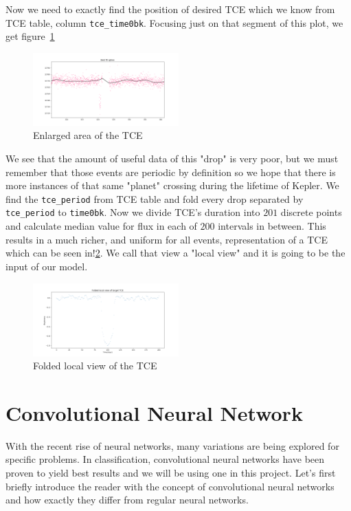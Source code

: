 \documentclass[twoside]{article}
\newcommand{\code}[1]{\texttt{#1}}
\begin{document}
\begin{multicols}{2}
Now we need to exactly find the position of desired TCE which we know from TCE table, column \code{tce\_time0bk}. Focusing just on that segment of this plot, we get figure~\ref{fig:enlarged_tce}
\begin{figure}[H]
\includegraphics[width=0.5\textwidth]{splinezoomLC-9517393}
\caption{Enlarged area of the TCE}
\label{fig:enlarged_tce}
\end{figure}

We see that the amount of useful data of this "drop" is very poor, but we must remember that those events are periodic by definition so we hope that there is more instances of that same "planet" crossing during the lifetime of Kepler. We find the \code{tce\_period} from TCE table and fold every drop separated by \code{tce\_period} to \code{time0bk}. Now we divide TCE's duration into $201$ discrete points and calculate median value for flux in each of $200$ intervals in between. This results in a much richer, and uniform for all events, representation of a TCE which can be seen in!\ref{fig:folded_tce}. We call that view a "local view" and it is going to be the input of our model.
\begin{figure}[H]
\includegraphics[width=0.5\textwidth]{localvierLCdrop-9517393}
\caption{Folded local view of the TCE}
\label{fig:folded_tce}
\end{figure}

\section{Convolutional Neural Network}
With the recent rise of neural networks, many variations are being explored for specific problems. In classification, convolutional neural networks have been proven to yield best results and we will be using one in this project.  Let's first briefly introduce the reader with the concept of convolutional neural networks and how exactly they differ from regular neural networks.


\end{multicols}
\end{document}
